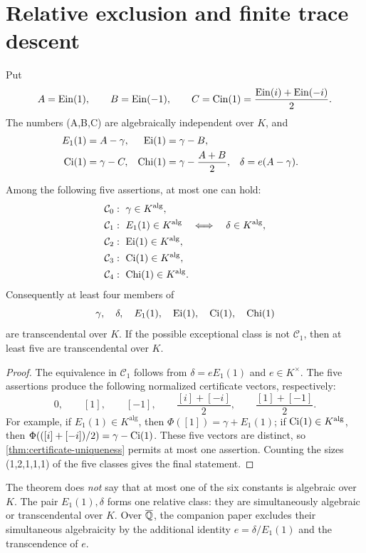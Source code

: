 \section{Relative exclusion and finite trace descent}
\label{sec:relative}

Put
\[
 A=\operatorname{Ein}(1),\qquad B=\operatorname{Ein}(-1),\qquad
 C=\operatorname{Cin}(1)=\frac{\operatorname{Ein}(i)+\operatorname{Ein}(-i)}2.
\]
The numbers (A,B,C) are algebraically independent over \(K\), and
\begin{align}
 E_1(1)&=A-\gamma,&
 \operatorname{Ei}(1)&=\gamma-B,\label{eq:six-identities}\\
 \operatorname{Ci}(1)&=\gamma-C,&
 \operatorname{Chi}(1)&=\gamma-\frac{A+B}{2},&
 \delta&=e(A-\gamma).\notag
\end{align}

\begin{theorem}
\label{thm:five-classes}
Among the following five assertions, at most one can hold:
\begin{align*}
 \mathcal C_0&:\ \gamma\in K^{\mathrm{alg}},\\
 \mathcal C_1&:\ E_1(1)\in K^{\mathrm{alg}}
 \quad\Longleftrightarrow\quad \delta\in K^{\mathrm{alg}},\\
 \mathcal C_2&:\ \operatorname{Ei}(1)\in K^{\mathrm{alg}},\\
 \mathcal C_3&:\ \operatorname{Ci}(1)\in K^{\mathrm{alg}},\\
 \mathcal C_4&:\ \operatorname{Chi}(1)\in K^{\mathrm{alg}}.
\end{align*}
Consequently at least four members of
\[
 \gamma,\quad\delta,\quad E_1(1),\quad\operatorname{Ei}(1),\quad\operatorname{Ci}(1),\quad\operatorname{Chi}(1)
\]
are transcendental over \(K\).  If the possible exceptional class is not
\(\mathcal C_1\), then at least five are transcendental over \(K\).
\end{theorem}

\begin{proof}
The equivalence in \(\mathcal C_1\) follows from
\(\delta=eE_1(1)\) and \(e\in K^\times\).  The five assertions produce the
following normalized certificate vectors, respectively:
\[
 0,\qquad [1],\qquad[-1],\qquad
 \frac{[i]+[-i]}2,\qquad
 \frac{[1]+[-1]}2.
\]
For example, if \(E_1(1)\in K^{\mathrm{alg}}\), then
\(\Phi([1])=\gamma+E_1(1)\); if \(\operatorname{Ci}(1)\in K^{\mathrm{alg}}\), then
\(\Phi(([i]+[-i])/2)=\gamma-\operatorname{Ci}(1)\).  These five vectors are distinct, so
\cref{thm:certificate-uniqueness} permits at most one assertion.  Counting
the sizes (1,2,1,1,1) of the five classes gives the final statement.
\end{proof}

\begin{remark}
The theorem does \emph{not} say that at most one of the six constants is
algebraic over \(K\).  The pair \(E_1(1),\delta\) forms one relative class:
they are simultaneously algebraic or transcendental over \(K\).  Over
\(\overline{\mathbb Q}\), the companion paper excludes their simultaneous algebraicity by
the additional identity \(e=\delta/E_1(1)\) and the transcendence of \(e\).
\end{remark}


